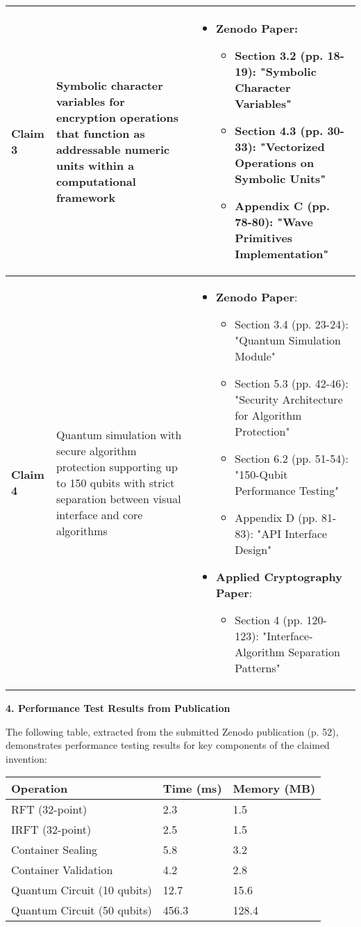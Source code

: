 \documentclass[12pt,letterpaper]{article}
\newcommand{\papertitle}[1]{\noindent\begin{center}\textbf{#1}\end{center}}
\begin{document}
\begin{longtable}{|p{1in}|p{2.5in}|p{2.5in}|}
\hline
\textbf{Claim 3} & 
Symbolic character variables for encryption operations that function as addressable numeric units within a computational framework & 
\begin{itemize}
\item \textbf{Zenodo Paper}:
  \begin{itemize}
  \item Section 3.2 (pp. 18-19): "Symbolic Character Variables"
  \item Section 4.3 (pp. 30-33): "Vectorized Operations on Symbolic Units"
  \item Appendix C (pp. 78-80): "Wave Primitives Implementation"
  \end{itemize}
\end{itemize} \\
\hline
\textbf{Claim 4} & 
Quantum simulation with secure algorithm protection supporting up to 150 qubits with strict separation between visual interface and core algorithms & 
\begin{itemize}
\item \textbf{Zenodo Paper}:
  \begin{itemize}
  \item Section 3.4 (pp. 23-24): "Quantum Simulation Module"
  \item Section 5.3 (pp. 42-46): "Security Architecture for Algorithm Protection"
  \item Section 6.2 (pp. 51-54): "150-Qubit Performance Testing"
  \item Appendix D (pp. 81-83): "API Interface Design"
  \end{itemize}
\item \textbf{Applied Cryptography Paper}:
  \begin{itemize}
  \item Section 4 (pp. 120-123): "Interface-Algorithm Separation Patterns"
  \end{itemize}
\end{itemize} \\
\hline
\end{longtable}

\newpage
\papertitle{4. Performance Test Results from Publication}

\noindent The following table, extracted from the submitted Zenodo publication (p. 52), demonstrates performance testing results for key components of the claimed invention:

\begin{longtable}{|p{2.5in}|p{1in}|p{1in}|}
\hline
\textbf{Operation} & \textbf{Time (ms)} & \textbf{Memory (MB)} \\
\hline
RFT (32-point) & 2.3 & 1.5 \\
\hline
IRFT (32-point) & 2.5 & 1.5 \\
\hline
Container Sealing & 5.8 & 3.2 \\
\hline
Container Validation & 4.2 & 2.8 \\
\hline
Quantum Circuit (10 qubits) & 12.7 & 15.6 \\
\hline
Quantum Circuit (50 qubits) & 456.3 & 128.4 \\
\hline
\end{longtable}
\end{document}
